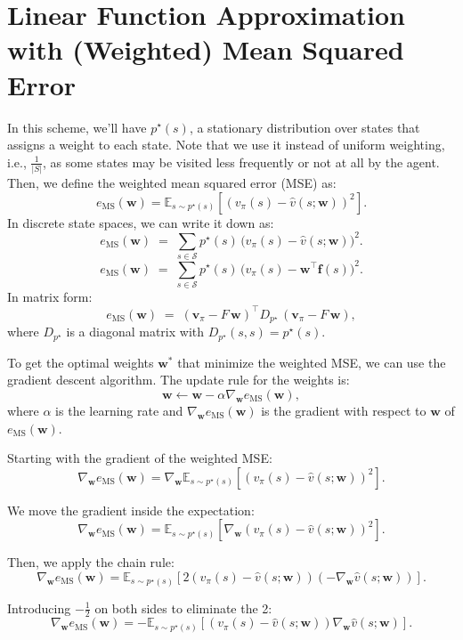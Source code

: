 \section{Linear Function Approximation with (Weighted) Mean Squared Error}

In this scheme, we'll have \(p^\star(s)\), a stationary distribution over states that assigns a weight to each state. Note that we use it instead of uniform weighting, i.e., \(\frac{1}{|S|}\), as some states may be visited less frequently or not at all by the agent. Then, we define the weighted mean squared error (MSE) as:
\[
e_{\text{MS}}(\mathbf{w}) 
= \mathbb{E}_{s \sim p^\star(s)}\left[\left(v_\pi(s) - \hat{v}(s;\mathbf{w})\right)^2\right].
\]
In discrete state spaces, we can write it down as:
\[
e_{\text{MS}}(\mathbf{w})
\;=\; \sum_{s \in \mathcal{S}} p^\star(s)\,\bigl(v_\pi(s) - \hat{v}(s;\mathbf{w})\bigr)^2.
\]
\[
e_{\text{MS}}(\mathbf{w})
\;=\; \sum_{s \in \mathcal{S}} p^\star(s)\,\bigl(v_\pi(s) - \mathbf{w}^\top \mathbf{f}(s)\bigr)^2.
\]
In matrix form:
\[
e_{\text{MS}}(\mathbf{w}) 
\;=\; (\mathbf{v}_\pi - F\,\mathbf{w})^\top D_{p^\star} \,(\mathbf{v}_\pi - F\,\mathbf{w}),
\]
where \(D_{p^\star}\) is a diagonal matrix with \(D_{p^\star}(s,s) = p^\star(s)\). 

To get the optimal weights \(\mathbf{w}^*\) that minimize the weighted MSE, we can use the gradient descent algorithm. The update rule for the weights is:
\[
\mathbf{w} \leftarrow \mathbf{w} - \alpha \nabla_{\mathbf{w}} e_{\text{MS}}(\mathbf{w}),
\]
where \(\alpha\) is the learning rate and \(\nabla_{\mathbf{w}} e_{\text{MS}}(\mathbf{w})\) is the gradient with respect to \(\mathbf{w}\) of \(e_{\text{MS}}(\mathbf{w})\).

Starting with the gradient of the weighted MSE:
\[
\nabla_{\mathbf{w}} e_{\text{MS}}(\mathbf{w}) = \nabla_{\mathbf{w}} \mathbb{E}_{s \sim p^\star(s)}\left[\left(v_\pi(s) - \hat{v}(s;\mathbf{w})\right)^2\right].
\]

We move the gradient inside the expectation:
\[
\nabla_{\mathbf{w}} e_{\text{MS}}(\mathbf{w}) = \mathbb{E}_{s \sim p^\star(s)}\left[\nabla_{\mathbf{w}} \left(v_\pi(s) - \hat{v}(s;\mathbf{w})\right)^2\right].
\]

Then, we apply the chain rule:
\[
\nabla_{\mathbf{w}} e_{\text{MS}}(\mathbf{w}) = \mathbb{E}_{s \sim p^\star(s)}\left[2 \left(v_\pi(s) - \hat{v}(s;\mathbf{w})\right) \left(- \nabla_{\mathbf{w}} \hat{v}(s;\mathbf{w})\right)\right].
\]

Introducing \(-\frac{1}{2}\) on both sides to eliminate the 2:
\[
\nabla_{\mathbf{w}} e_{\text{MS}}(\mathbf{w}) = - \mathbb{E}_{s \sim p^\star(s)}\left[\left(v_\pi(s) - \hat{v}(s;\mathbf{w})\right) \nabla_{\mathbf{w}} \hat{v}(s;\mathbf{w})\right].
\]

